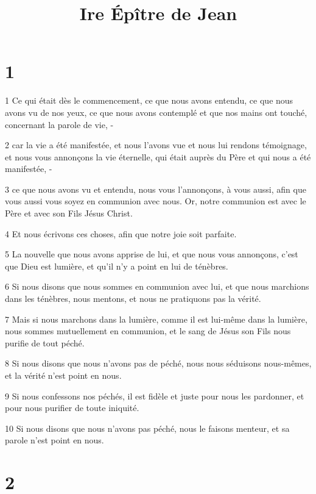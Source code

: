 

\title{Ire Épître de Jean}


\chapter{1}

\par 1 Ce qui était dès le commencement, ce que nous avons entendu, ce que nous avons vu de nos yeux, ce que nous avons contemplé et que nos mains ont touché, concernant la parole de vie, -
\par 2 car la vie a été manifestée, et nous l'avons vue et nous lui rendons témoignage, et nous vous annonçons la vie éternelle, qui était auprès du Père et qui nous a été manifestée, -
\par 3 ce que nous avons vu et entendu, nous vous l'annonçons, à vous aussi, afin que vous aussi vous soyez en communion avec nous. Or, notre communion est avec le Père et avec son Fils Jésus Christ.
\par 4 Et nous écrivons ces choses, afin que notre joie soit parfaite.
\par 5 La nouvelle que nous avons apprise de lui, et que nous vous annonçons, c'est que Dieu est lumière, et qu'il n'y a point en lui de ténèbres.
\par 6 Si nous disons que nous sommes en communion avec lui, et que nous marchions dans les ténèbres, nous mentons, et nous ne pratiquons pas la vérité.
\par 7 Mais si nous marchons dans la lumière, comme il est lui-même dans la lumière, nous sommes mutuellement en communion, et le sang de Jésus son Fils nous purifie de tout péché.
\par 8 Si nous disons que nous n'avons pas de péché, nous nous séduisons nous-mêmes, et la vérité n'est point en nous.
\par 9 Si nous confessons nos péchés, il est fidèle et juste pour nous les pardonner, et pour nous purifier de toute iniquité.
\par 10 Si nous disons que nous n'avons pas péché, nous le faisons menteur, et sa parole n'est point en nous.

\chapter{2}

